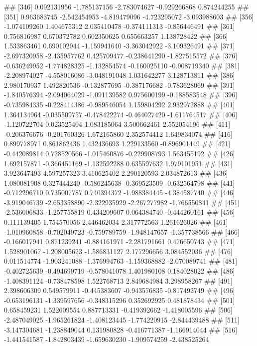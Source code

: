 \documentclass[
]{article}
\begin{document}
\begin{enumerate}[label=(\alph*)]
##  [346]  0.092131956 -1.785137156 -2.783074627 -0.929266868  0.874244255
##  [351]  0.963683745 -2.542454953 -4.819479096 -4.723295072 -3.093988603
##  [356] -1.074109260  1.404675312  2.035410478 -0.374111313 -0.856446491
##  [361]  0.756816987  0.670372782  0.602350625  0.655663257  1.138728422
##  [366]  1.533863461  0.690102944 -1.159941640 -3.363042922 -3.109326491
##  [371] -2.697320958 -2.435957762  0.425709477 -0.238641290 -1.827515572
##  [376] -0.636249952 -1.774828325 -1.132854574 -0.160025110 -0.908719340
##  [381] -2.208974027 -4.558016086 -3.048191048  1.031642277  3.128713811
##  [386]  2.980170937  1.492820536 -0.132877695 -0.387176682 -0.783628069
##  [391] -1.840576394 -2.094064029 -1.091139582  0.975600199 -0.188583548
##  [396] -0.735984335 -0.228414386 -0.989546054  1.159804292  2.932972888
##  [401]  1.364134964 -0.035509757 -0.478422274 -0.464027420 -1.611764517
##  [406] -1.120722704  0.023525404  1.083185064  3.500662461  2.552054196
##  [411] -0.206376676 -0.201760326  1.672165860  2.352574412  1.649834074
##  [416]  0.899778971  0.861862436  1.432436693  1.229133560 -0.896901449
##  [421] -0.442089814  0.728520566 -1.015460876 -0.229908793  1.563455192
##  [426]  1.692157871 -0.366451169 -1.132592288  0.635597632  1.979101951
##  [431]  3.923647493  4.597257323  3.410625402  2.290120593  2.034872613
##  [436]  1.080081908  0.327444240 -0.586245638 -0.369523509 -0.632564798
##  [441] -0.712296710  0.735007787  0.740394372 -1.988384445 -4.384587740
##  [446] -3.919046739 -2.653358890 -2.322935929 -2.267277982 -1.766550841
##  [451] -2.536006833 -1.257755819  0.434209607  0.064384740 -0.444260161
##  [456]  0.111139405  1.754570056  2.446462034  2.317772563  1.261626026
##  [461] -1.010960858 -0.702049723 -0.759789759 -1.948147657 -1.357738566
##  [466] -0.166017941  0.871239241 -0.884161971 -2.281791661  0.476650743
##  [471]  1.528901067 -1.208005623 -1.586831127  2.177296656  3.084552036
##  [476]  0.011514774 -1.903241088 -1.376994763 -1.159368882 -2.070089741
##  [481] -0.402725639 -0.494699719 -0.578041078  1.401980108  0.184028022
##  [486] -1.408391124 -0.738478598  1.522768713  2.849684984  3.298958267
##  [491]  2.398606309  0.549579911 -0.445383607 -0.943576835 -0.817492749
##  [496] -0.653196131 -1.339597656 -0.348315296  0.352692925  0.481878434
##  [501]  0.658459231  1.522609554  0.887713331 -0.419392662 -1.418005596
##  [506] -2.487049025 -1.965261824 -1.408123445 -1.774220915 -2.844439488
##  [511] -3.147304681 -1.238849044  0.131980828 -0.416771387 -1.166914044
##  [516] -1.441541587 -1.842803439 -1.659630230 -1.909574259 -2.438525264

\end{enumerate}
\end{document}
